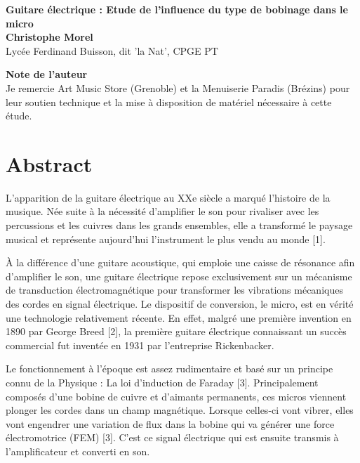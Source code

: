 \documentclass[11pt, a4paper]{article}
\begin{document}
\begin{titlepage}
    \vspace*{\fill}
    \begin{center}
        {\Huge \textbf{Guitare électrique : Etude de l'influence du type de bobinage dans le micro}} \\[2cm]
        {\Large \textbf{Christophe Morel}} \\[0.5cm]
        {\large Lycée Ferdinand Buisson, dit 'la Nat', CPGE PT} \\[3cm]
    \end{center}
    
    \textbf{Note de l'auteur} \\
    Je remercie Art Music Store (Grenoble) et la Menuiserie Paradis (Brézins) pour leur soutien technique et la mise à disposition de matériel nécessaire à cette étude.
    \vspace*{\fill}
\end{titlepage}

\newpage

\section*{Abstract}
L'apparition de la guitare électrique au XXe siècle a marqué l'histoire de la musique. Née suite à la nécessité d'amplifier le son pour rivaliser avec les percussions et les cuivres dans les grands ensembles, elle a transformé le paysage musical et représente aujourd'hui l'instrument le plus vendu au monde [1].

À la différence d'une guitare acoustique, qui emploie une caisse de résonance afin d'amplifier le son, une guitare électrique repose exclusivement sur un mécanisme de transduction électromagnétique pour transformer les vibrations mécaniques des cordes en signal électrique. Le dispositif de conversion, le micro, est en vérité une technologie relativement récente. En effet, malgré une première invention en 1890 par George Breed [2], la première guitare électrique connaissant un succès commercial fut inventée en 1931 par l'entreprise Rickenbacker.

Le fonctionnement à l'époque est assez rudimentaire et basé sur un principe connu de la Physique : La loi d'induction de Faraday [3]. Principalement composés d'une bobine de cuivre et d'aimants permanents, ces micros viennent plonger les cordes dans un champ magnétique. Lorsque celles-ci vont vibrer, elles vont engendrer une variation de flux dans la bobine qui va générer une force électromotrice (FEM) [3]. C'est ce signal électrique qui est ensuite transmis à l'amplificateur et converti en son.
\end{document}
